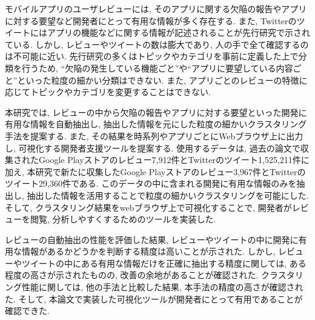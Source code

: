 
モバイルアプリのユーザレビューには, そのアプリに関する欠陥の報告やアプリに対する要望など開発者にとって有用な情報が多く存在する. また, Twitterのツイートにはアプリの機能などに関する情報が記述されることが先行研究で示されている. しかし, レビューやツイートの数は膨大であり, 人の手で全て確認するのは不可能に近い. 
先行研究の多くはトピックやカテゴリを事前に定義した上で分類を行うため, ``欠陥の発生している機能ごと''や``アプリに要望している内容ごと''といった粒度の細かい分類はできない. また, アプリごとのレビューの特徴に応じてトピックやカテゴリを変更することはできない. 

本研究では, レビューの中から欠陥の報告やアプリに対する要望といった開発に有用な情報を自動抽出し, 抽出した情報を元にした粒度の細かいクラスタリング手法を提案する. また, その結果を時系列やアプリごとにWebブラウザ上に出力し, 可視化する開発者支援ツールを提案する.
使用するデータは, 過去の論文で収集されたGoogle Playストアのレビュー7,912件とTwitterのツイート1,525,211件に加え, 本研究で新たに収集したGoogle Playストアのレビュー3,967件とTwitterのツイート29,360件である. このデータの中に含まれる開発に有用な情報のみを抽出し, 抽出した情報を活用することで粒度の細かいクラスタリングを可能にした. 
そして, クラスタリング結果をwebブラウザ上で可視化することで, 開発者がレビューを閲覧, 分析しやすくするためのツールを実装した. 

レビューの自動抽出の性能を評価した結果, レビューやツイートの中に開発に有用な情報があるかどうかを判断する精度は高いことが示された. 
しかし, レビューやツイートの中にある有用な情報だけを正確に抽出する精度に関しては, ある程度の高さが示されたものの, 改善の余地があることが確認された. 
クラスタリング性能に関しては, 他の手法と比較した結果, 本手法の精度の高さが確認された. 
そして, 本論文で実装した可視化ツールが開発者にとって有用であることが確認できた. 
